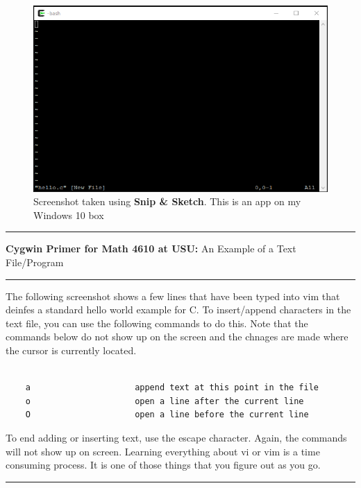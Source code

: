 \documentclass[10pt,fleqn]{article}
\begin{document}
\begin{figure}[h]
\centering
\includegraphics{../images/cygwin_06.png}
\caption{{Screenshot} taken using {\bf Snip \& Sketch}. This is an app on
         my Windows 10 box}
\end{figure}
\eject
\vskip0.1in\hrule\vskip0.1in
\noindent
{{\bf Cygwin Primer for Math 4610 at USU:} An Example of a Text File/Program} 
\vskip0.1in\hrule\vskip0.1in
\noindent
The following screenshot shows a few lines that have been typed into vim that
deinfes a standard hello world example for C. To insert/append characters in the
text file, you can use the following commands to do this. Note that the commands
below do not show up on the screen and the chnages are made where the cursor is
currently located.
\begin{verbatim}

    a                     append text at this point in the file
    o                     open a line after the current line
    O                     open a line before the current line

\end{verbatim}
To end adding or inserting text, use the escape character. Again, the commands
will not show up on screen. Learning everything about vi or vim is a time
consuming process. It is one of those things that you figure out as you go.
\vskip0.1in\hrule\vskip0.1in
\vfill
\end{document}
